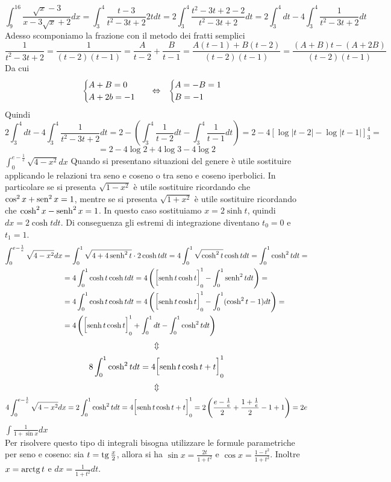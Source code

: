 \documentclass{article}
\begin{document}
\begin{enumerate}[label=\textbf{Esercizio 11.\arabic*.},itemindent=*]
\begin{tasks}
    \[\int_{9}^{16}\frac{\sqrt{x}-3}{x-3\sqrt{x}+2}dx=\int_3^4\frac{t-3}{t^2-3t+2}2tdt=2\int _3^4\frac{t^2-3t+2-2}{t^2-3t+2}dt=2\int_3^4dt-4\int_3^4 \frac{1}{t^2-3t+2}dt\]
    Adesso scomponiamo la frazione con il metodo dei fratti semplici
    \[\frac{1}{t^2-3t+2}=\frac{1}{(t-2)(t-1)}=\frac{A}{t-2}+\frac{B}{t-1}=\frac{A(t-1)+B(t-2)}{(t-2)(t-1)}=\frac{(A+B)t-(A+2B)}{(t-2)(t-1)}\]
    Da cui \[\begin{cases}
        A+B=0\\A+2b=-1
    \end{cases}~~\Leftrightarrow~~\begin{cases}
        A=-B=1\\B=-1
    \end{cases}\]
    Quindi
    \[2\int_3^4dt-4\int_3^4 \frac{1}{t^2-3t+2}dt=2-\left( \int_3^4\frac{1}{t-2}dt -\int_3^4\frac{1}{t-1}dt\right)=2-4\left[ \log|t-2| -\log|t-1|\right]_3^4=\]\[=2-4\log2+4\log3-4\log2\]
    \task \(\int_{0}^{e-\frac{1}{e}}\sqrt{4-x^2}dx\)
    Quando si presentano situazioni del genere è utile sostituire applicando le relazioni tra seno e coseno o tra seno e coseno iperbolici. In particolare se si presenta $\sqrt{1-x^2}$ è utile sostituire ricordando che $\cos^2x+\operatorname{sen}^2x=1$, mentre se si presenta $\sqrt{1+x^2}$ è utile sostituire ricordando che $\cosh^2x-\operatorname{senh}^2x=1$. In questo caso sostituiamo $x=2\sinh t$, quindi $dx=2\cosh t dt$. Di conseguenza gli estremi di integrazione diventano $t_0=0$ e $t_1=1$.
    \[
    \begin{aligned}
        \int_{0}^{e-\frac{1}{e}}\sqrt{4-x^2}dx&=\int_0^1\sqrt{4+4\operatorname{senh}^2t}\cdot 2\cosh tdt=4\int_0^1\sqrt{\cosh^2t}\cosh t dt=\int_0^1\cosh^2 tdt=\\&=4\int_0^1\cosh t\cosh t dt=4\left( \biggl[ \operatorname{senh} t\cosh t \biggr]_0^1-\int_0^1\operatorname{senh}^2tdt \right)=\\&=4\int_0^1\cosh t\cosh t dt=4\left( \biggl[ \operatorname{senh} t\cosh t \biggr]_0^1-\int_0^1(\cosh^2t-1)dt \right)=\\&=4\left( \biggl[\operatorname{senh} t\cosh t\biggr]_0^1+\int _0^1dt-\int_0^1\cosh^2tdt \right)
    \end{aligned}\]
    \[\Updownarrow\]
    \[8\int_0^1\cosh^2tdt=4\biggl[\operatorname{senh} t\cosh t +t\biggr]_0^1\]
    \[\Updownarrow\]
    \[4\int_{0}^{e-\frac{1}{e}}\sqrt{4-x^2}dx=2\int_0^1\cosh^2tdt=4\biggl[\operatorname{senh} t\cosh t +t\biggr]_0^1=2\left( \frac{e-\frac{1}{e}}{2} +\frac{1+\frac{1}{e}}{2}-1+1\right)=2e\]
    \task \(\int\frac{1}{1+\sin x}dx\)\\
    Per risolvere questo tipo di integrali bisogna utilizzare le formule parametriche per seno e coseno: sia $t=\operatorname{tg}\frac{x}{2}$, allora si ha $\sin x= \frac{2t}{1+t^2}$ e $\cos x= \frac{1-t^2}{1+t^2}$. Inoltre $x=\operatorname{arctg} t$ e $dx =\frac{1}{1+t^2}dt$. 

\end{tasks}
\end{enumerate}
\end{document}
